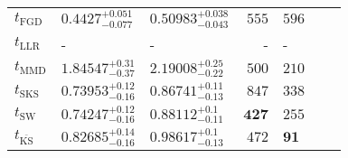 \begin{tabular}{l|llr|llr}
	\midrule
	$t_{\mathrm{FGD}}$ & ${\mathbf{0.4427_{-0.077}^{+0.051}}}$ & ${\mathbf{0.50983_{-0.043}^{+0.038}}}$ & $555$ & $596$ \\
	$t_{\mathrm{LLR}}$ & - & - & - & - \\
	$t_{\mathrm{MMD}}$ & $1.84547_{-0.37}^{+0.31}$ & $2.19008_{-0.22}^{+0.25}$ & $500$ & $210$ \\
	$t_{\mathrm{SKS}}$ & $0.73953_{-0.16}^{+0.12}$ & $0.86741_{-0.13}^{+0.11}$ & $847$ & $338$ \\
	$t_{\mathrm{SW}}$ & $0.74247_{-0.16}^{+0.12}$ & $0.88112_{-0.11}^{+0.1}$ & ${\mathbf{427}}$ & $255$ \\
	$t_{\overline{\mathrm{KS}}}$ & $0.82685_{-0.16}^{+0.14}$ & $0.98617_{-0.13}^{+0.1}$ & $472$ & ${\mathbf{91}}$ \\
	\bottomrule
\end{tabular}